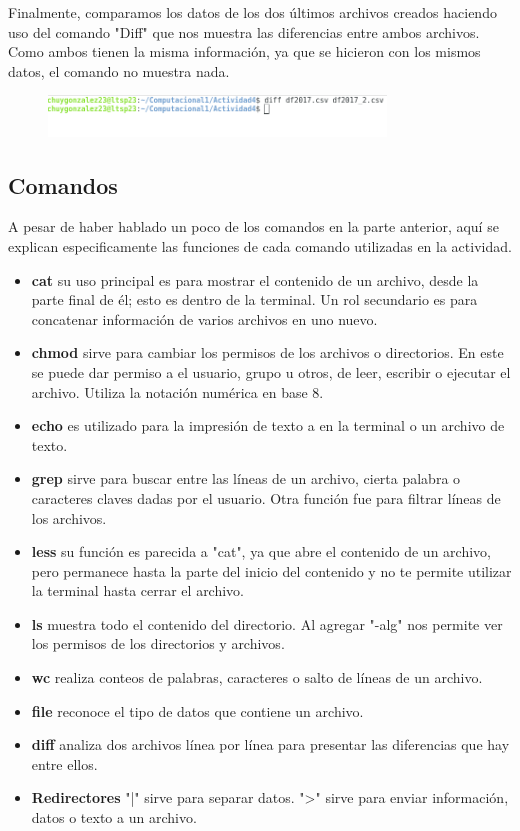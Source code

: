 \documentclass[a4paper]{article}
\begin{document}
Finalmente, comparamos los datos de los dos últimos archivos creados haciendo uso del comando "Diff" que nos muestra las diferencias entre ambos archivos. Como ambos tienen la misma información, ya que se hicieron con los mismos datos, el comando no muestra nada.

\begin{figure}[h!]
 \centering
  \includegraphics[width=0.8\textwidth]{PAct6.png}
\end{figure}

\subsection{Comandos}
A pesar de haber hablado un poco de los comandos en la parte anterior, aquí se explican especificamente las funciones de cada comando utilizadas en la actividad.
\begin{itemize}
\item \textbf{cat} su uso principal es para mostrar el contenido de un archivo, desde la parte final de él; esto es dentro de la terminal. Un rol secundario es para concatenar información de varios archivos en uno nuevo.
\item \textbf{chmod} sirve para cambiar los permisos de los archivos o directorios. En este se puede dar permiso a el usuario, grupo u otros, de leer, escribir o ejecutar el archivo. Utiliza la notación numérica en base 8.
\item \textbf{echo} es utilizado para la impresión de texto a en la terminal o un archivo de texto. 
\item \textbf{grep} sirve para buscar entre las líneas de un archivo, cierta palabra o caracteres claves dadas por el usuario. Otra función fue para filtrar líneas de los archivos.
\item \textbf{less} su función es parecida a "cat", ya que abre el contenido de un archivo, pero permanece hasta la parte del inicio del contenido y no te permite utilizar la terminal hasta cerrar el archivo. 
\item \textbf{ls} muestra todo el contenido del directorio. Al agregar "-alg" nos permite ver los permisos de los directorios y archivos. 
\item \textbf{wc} realiza conteos de palabras, caracteres o salto de líneas de un archivo.
\item \textbf{file} reconoce el tipo de datos que contiene un archivo. 
\item \textbf{diff} analiza dos archivos línea por línea para presentar las diferencias que hay entre ellos.
\item \textbf{Redirectores} "|" sirve para separar datos. ">" sirve para enviar información, datos o texto a un archivo.
\end{itemize}
\end{document}
